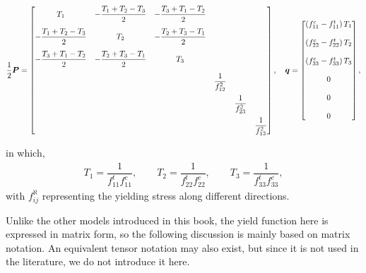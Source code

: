 \begin{tiny}
    \begin{gather}\label{eq:hoffman_criterion}
        \dfrac{1}{2}\bm{P}=\begin{bmatrix}
            T_1                     & -\dfrac{T_1+T_2-T_3}{2} & -\dfrac{T_3+T_1-T_2}{2} &                     &                     &                     \\[4mm]
            -\dfrac{T_1+T_2-T_3}{2} & T_2                     & -\dfrac{T_2+T_3-T_1}{2} &                     &                     &                     \\[4mm]
            -\dfrac{T_3+T_1-T_2}{2} & -\dfrac{T_2+T_3-T_1}{2} & T_3                     &                     &                     &                     \\[4mm]
                                    &                         &                         & \dfrac{1}{f_{12}^2} &                     &                     \\[4mm]
                                    &                         &                         &                     & \dfrac{1}{f_{23}^2} &                     \\[4mm]
                                    &                         &                         &                     &                     & \dfrac{1}{f_{13}^2}
        \end{bmatrix},\quad
        \bm{q}=\begin{bmatrix}
            \left(f_{11}^c-f_{11}^t\right)T_1 \\[4mm]
            \left(f_{22}^c-f_{22}^t\right)T_2 \\[4mm]
            \left(f_{33}^c-f_{33}^t\right)T_3 \\[4mm]
            0                                 \\[4mm]
            0                                 \\[4mm]
            0
        \end{bmatrix},
    \end{gather}
\end{tiny}
in which,
\begin{gather}
    T_1=\dfrac{1}{f_{11}^tf_{11}^c},\qquad
    T_2=\dfrac{1}{f_{22}^tf_{22}^c},\qquad
    T_3=\dfrac{1}{f_{33}^tf_{33}^c},
\end{gather}
with $f_{ij}^\aleph$ representing the yielding stress along different directions.

Unlike the other models introduced in this book, the yield function here is expressed in matrix form, so the following discussion is mainly based on matrix notation.
An equivalent tensor notation may also exist, but since it is not used in the literature, we do not introduce it here.
